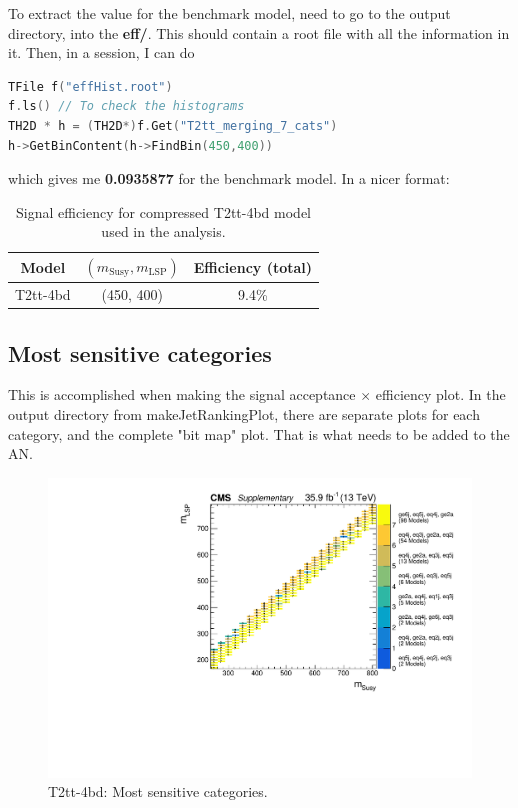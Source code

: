 To extract the value for the benchmark model, need to go to the output directory, into the \textbf{eff/}. This should contain a root file with all the information in it. Then, in a \ROOT session, I can do

\begin{lstlisting}[belowskip=-0.7cm, language=C++, numbers=none]
TFile f("effHist.root")
f.ls() // To check the histograms
TH2D * h = (TH2D*)f.Get("T2tt_merging_7_cats")
h->GetBinContent(h->FindBin(450,400))
\end{lstlisting}

which gives me \textbf{0.0935877} for the benchmark model. In a nicer format:

\begin{table}[htbp]
    \caption{Signal efficiency for compressed T2tt-4bd model used in the analysis.}
    \label{tab:sig-effT2ttBenchmark}
    \centering
    \begin{tabular}{ ccc }
        \hline \hline
        Model & $(m_{\mathrm{Susy}},m_{\mathrm{LSP}})$ & Efficiency (total) \\
        \hline
        T2tt-4bd & (450, 400) & 9.4\% \\
        \hline \hline
        \end{tabular}
        \end{table}


\subsection{Most sensitive \texorpdfstring{\njet}{njet} categories}

This is accomplished when making the signal acceptance $\times$ efficiency plot. In the output directory from makeJetRankingPlot, there are separate plots for each \njet category, and the complete "bit map" plot. That is what needs to be added to the AN.

\begin{figure}[htbp]
\centering
\includegraphics[width=120mm]{./sec31/T2tt_bitMap_improved.pdf}
\caption{T2tt-4bd: Most sensitive categories.}
\end{figure}


